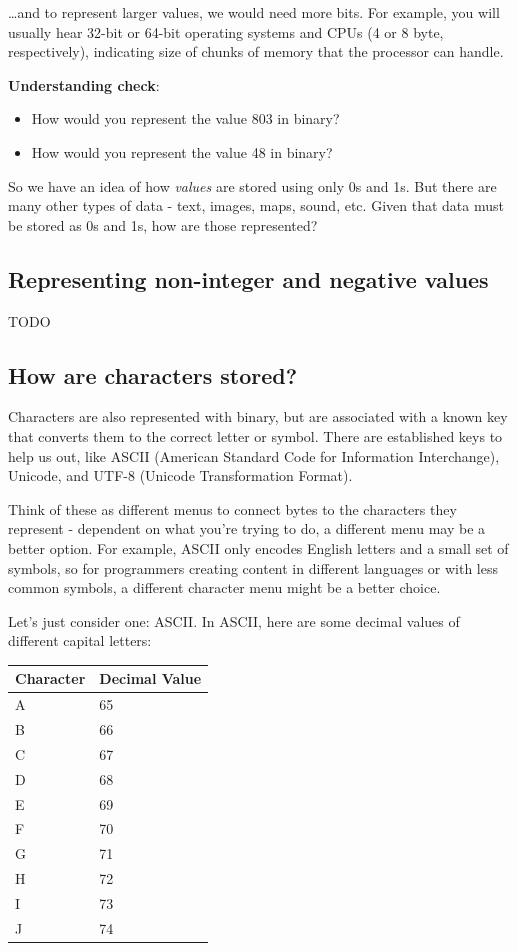 \documentclass[
]{book}
\begin{document}
\ldots and to represent larger values, we would need more bits. For example, you will usually hear 32-bit or 64-bit operating systems and CPUs (4 or 8 byte, respectively), indicating size of chunks of memory that the processor can handle.

\textbf{Understanding check}:

\begin{itemize}
\item
  How would you represent the value 803 in binary?
\item
  How would you represent the value 48 in binary?
\end{itemize}

So we have an idea of how \emph{values} are stored using only 0s and 1s. But there are many other types of data - text, images, maps, sound, etc. Given that data must be stored as 0s and 1s, how are those represented?

\hypertarget{representing-non-integer-and-negative-values}{%
\subsection{Representing non-integer and negative values}\label{representing-non-integer-and-negative-values}}

TODO

\hypertarget{how-are-characters-stored}{%
\subsection{How are characters stored?}\label{how-are-characters-stored}}

Characters are also represented with binary, but are associated with a known key that converts them to the correct letter or symbol. There are established keys to help us out, like ASCII (American Standard Code for Information Interchange), Unicode, and UTF-8 (Unicode Transformation Format).

Think of these as different menus to connect bytes to the characters they represent - dependent on what you're trying to do, a different menu may be a better option. For example, ASCII only encodes English letters and a small set of symbols, so for programmers creating content in different languages or with less common symbols, a different character menu might be a better choice.

Let's just consider one: ASCII. In ASCII, here are some decimal values of different capital letters:

\begin{longtable}[]{@{}ll@{}}
\toprule
Character & Decimal Value \\
\midrule
\endhead
A & 65 \\
B & 66 \\
C & 67 \\
D & 68 \\
E & 69 \\
F & 70 \\
G & 71 \\
H & 72 \\
I & 73 \\
J & 74 \\
\bottomrule
\end{longtable}
\end{document}
